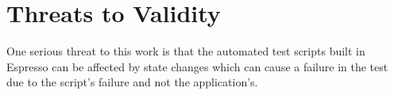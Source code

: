 \section{Threats to Validity}
One serious threat to this work is that the automated test scripts built in Espresso can be affected by state changes \cite{7927971} which can cause a failure in the test due to the script's failure and not the application's.